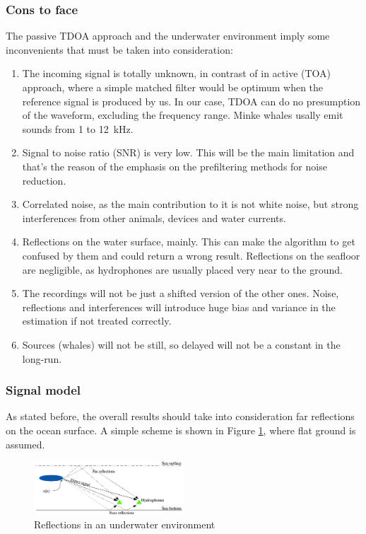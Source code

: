\subsubsection{Cons to face}
The passive TDOA approach and the underwater environment imply some inconvenients that must be taken into consideration:
\begin{enumerate}
  \item The incoming signal is totally unknown, in contrast of in active (TOA) approach, where a simple matched filter would be optimum when the reference signal is produced by us. In our case, TDOA can do no presumption of the waveform, excluding the frequency range. Minke whales usally emit sounds from 1 to \SI{12}{\kilo\Hz}.
  \item Signal to noise ratio (SNR) is very low. This will be the main limitation and that's the reason of the emphasis on the prefiltering methods for noise reduction.
  \item Correlated noise, as the main contribution to it is not white noise, but strong interferences from other animals, devices and water currents.
  \item Reflections on the water surface, mainly. This can make the algorithm to get confused by them and could return a wrong result. Reflections on the seafloor are negligible, as hydrophones are usually placed very near to the ground.
  \item The recordings will not be just a shifted version of the other ones. Noise, reflections and interferences will introduce huge bias and variance in the estimation if not treated correctly.
  \item Sources (whales) will not be still, so delayed will not be a constant in the long-run.
\end{enumerate}

\vspace{5pt}
\subsubsection{Signal model}
  As stated before, the overall results should take into consideration far reflections on the ocean surface. A simple scheme is shown in Figure \ref{fig:reflections}, where flat ground is assumed.  

  \vspace{5pt}
  \begin{figure}[htb]
	  \begin{center}
		  \includegraphics[width=0.5\textwidth]{figures/model.png}
	  \end{center}
	  \caption{Reflections in an underwater environment}
	  \label{fig:reflections}
  \end{figure}
  
